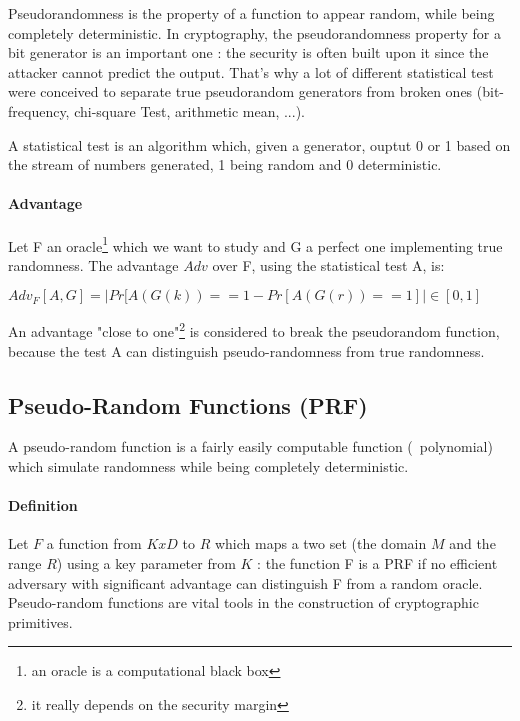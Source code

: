 Pseudorandomness is the property of a function to appear random, while being completely deterministic. In cryptography, the pseudorandomness property for a bit generator is an important one : the security is often built upon it since the attacker cannot predict the output. That's why a lot of different statistical test were conceived to separate true pseudorandom generators from broken ones (bit-frequency, chi-square Test, arithmetic mean, ...).

\begin{mydef}
A statistical test is an algorithm which, given a generator, ouptut 0 or 1 based on the stream of numbers generated, 1 being random and 0 deterministic.
\end{mydef}

\paragraph{Advantage \\}

Let F an oracle\footnote{an oracle is a computational black box} which we want to study and G a perfect one implementing true randomness. The advantage $Adv$ over F, using the statistical test A, is: 
\begin{mydef}
$Adv_{F} [A,G] = | Pr[A(G(k)) == 1  - Pr[A(G(r)) == 1] | \in  [0,1] $
\end{mydef}

An advantage "close to one"\footnote{it really depends on the security margin} is considered to break the pseudorandom function, because the test A can distinguish pseudo-randomness from true randomness.


\subsection{Pseudo-Random Functions   (PRF)}

A pseudo-random function is a fairly easily computable function (~polynomial) which simulate randomness while being completely deterministic.

\paragraph{Definition \\}
Let $F$ a function from $KxD$ to $R$ which maps a two set (the domain $M$ and the range $R$) using a key parameter from $K$ : the function F is a PRF if no efficient adversary with significant advantage can distinguish F from a random oracle. Pseudo-random functions are vital tools in the construction of cryptographic primitives.

